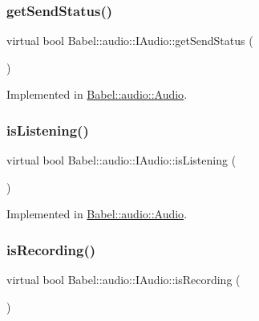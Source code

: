 \subsubsection{\texorpdfstring{get\+Send\+Status()}{getSendStatus()}}
{\footnotesize\ttfamily virtual bool Babel\+::audio\+::\+I\+Audio\+::get\+Send\+Status (\begin{DoxyParamCaption}{ }\end{DoxyParamCaption})\hspace{0.3cm}{\ttfamily [pure virtual]}}



Implemented in \hyperlink{classBabel_1_1audio_1_1Audio_afb3a0176f9f575c6f13a85ca1b92f375}{Babel\+::audio\+::\+Audio}.

\mbox{\label{classBabel_1_1audio_1_1IAudio_af11d02c62648df4fdf25dd6dbc64904b}} 
\subsubsection{\texorpdfstring{is\+Listening()}{isListening()}}
{\footnotesize\ttfamily virtual bool Babel\+::audio\+::\+I\+Audio\+::is\+Listening (\begin{DoxyParamCaption}{ }\end{DoxyParamCaption})\hspace{0.3cm}{\ttfamily [pure virtual]}}



Implemented in \hyperlink{classBabel_1_1audio_1_1Audio_a7491f94ee8a8bac6603727e29919cd12}{Babel\+::audio\+::\+Audio}.

\mbox{\label{classBabel_1_1audio_1_1IAudio_ad6660dbdc5c0448c67d3a2265eefd9a9}} 
\subsubsection{\texorpdfstring{is\+Recording()}{isRecording()}}
{\footnotesize\ttfamily virtual bool Babel\+::audio\+::\+I\+Audio\+::is\+Recording (\begin{DoxyParamCaption}{ }\end{DoxyParamCaption})\hspace{0.3cm}{\ttfamily [pure virtual]}}



